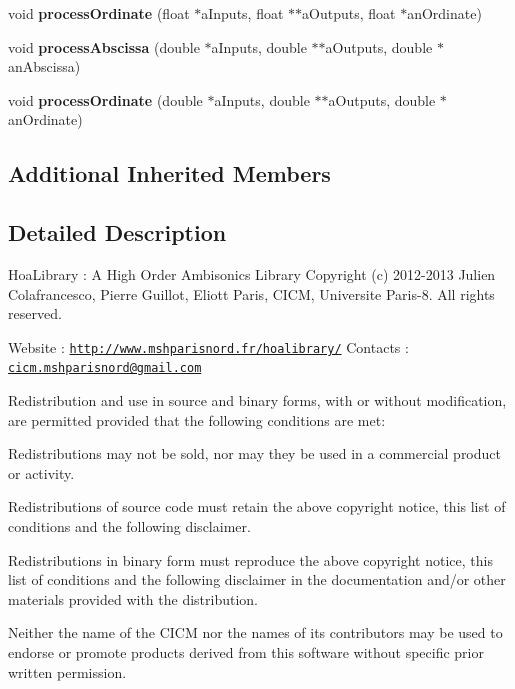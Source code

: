 \begin{DoxyCompactItemize}
\item 
\hypertarget{class_ambisonics_multi_maps_a99e786c532d9bfeabf0a9a0d5998ea72}{void {\bfseries process\-Ordinate} (float $\ast$a\-Inputs, float $\ast$$\ast$a\-Outputs, float $\ast$an\-Ordinate)}\label{class_ambisonics_multi_maps_a99e786c532d9bfeabf0a9a0d5998ea72}

\item 
\hypertarget{class_ambisonics_multi_maps_a02dc73d518ccf8da9f584a3d89705193}{void {\bfseries process\-Abscissa} (double $\ast$a\-Inputs, double $\ast$$\ast$a\-Outputs, double $\ast$an\-Abscissa)}\label{class_ambisonics_multi_maps_a02dc73d518ccf8da9f584a3d89705193}

\item 
\hypertarget{class_ambisonics_multi_maps_a0e73b65563ac00923c44f12c16d55592}{void {\bfseries process\-Ordinate} (double $\ast$a\-Inputs, double $\ast$$\ast$a\-Outputs, double $\ast$an\-Ordinate)}\label{class_ambisonics_multi_maps_a0e73b65563ac00923c44f12c16d55592}

\end{DoxyCompactItemize}
\subsection*{Additional Inherited Members}


\subsection{Detailed Description}
Hoa\-Library \-: A High Order Ambisonics Library Copyright (c) 2012-\/2013 Julien Colafrancesco, Pierre Guillot, Eliott Paris, C\-I\-C\-M, Universite Paris-\/8. All rights reserved.

Website \-: \href{http://www.mshparisnord.fr/hoalibrary/}{\tt http\-://www.\-mshparisnord.\-fr/hoalibrary/} Contacts \-: \href{mailto:cicm.mshparisnord@gmail.com}{\tt cicm.\-mshparisnord@gmail.\-com}

Redistribution and use in source and binary forms, with or without modification, are permitted provided that the following conditions are met\-:


\begin{DoxyItemize}
\item Redistributions may not be sold, nor may they be used in a commercial product or activity.
\item Redistributions of source code must retain the above copyright notice, this list of conditions and the following disclaimer.
\item Redistributions in binary form must reproduce the above copyright notice, this list of conditions and the following disclaimer in the documentation and/or other materials provided with the distribution.
\item Neither the name of the C\-I\-C\-M nor the names of its contributors may be used to endorse or promote products derived from this software without specific prior written permission.
\end{DoxyItemize}

